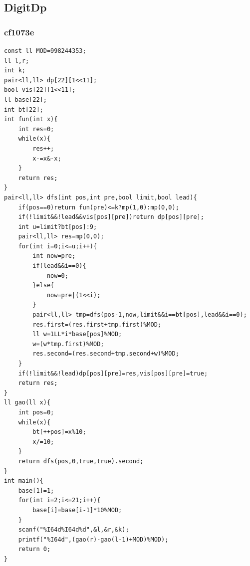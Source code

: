 \documentclass[twoside]{article}
\begin{document}
\subsection{DigitDp}
\subsubsection{cf1073e}
\begin{lstlisting}
const ll MOD=998244353;
ll l,r;
int k;
pair<ll,ll> dp[22][1<<11];
bool vis[22][1<<11];
ll base[22];
int bt[22];
int fun(int x){
    int res=0;
    while(x){
        res++;
        x-=x&-x;
    }
    return res;
}
pair<ll,ll> dfs(int pos,int pre,bool limit,bool lead){
    if(pos==0)return fun(pre)<=k?mp(1,0):mp(0,0);
    if(!limit&&!lead&&vis[pos][pre])return dp[pos][pre];
    int u=limit?bt[pos]:9;
    pair<ll,ll> res=mp(0,0);
    for(int i=0;i<=u;i++){
        int now=pre;
        if(lead&&i==0){
            now=0;
        }else{
            now=pre|(1<<i);
        }
        pair<ll,ll> tmp=dfs(pos-1,now,limit&&i==bt[pos],lead&&i==0);
        res.first=(res.first+tmp.first)%MOD;
        ll w=1LL*i*base[pos]%MOD;
        w=(w*tmp.first)%MOD;
        res.second=(res.second+tmp.second+w)%MOD;
    }
    if(!limit&&!lead)dp[pos][pre]=res,vis[pos][pre]=true;
    return res;
}
ll gao(ll x){
    int pos=0;
    while(x){
        bt[++pos]=x%10;
        x/=10;
    }
    return dfs(pos,0,true,true).second;
}
int main(){
    base[1]=1;
    for(int i=2;i<=21;i++){
        base[i]=base[i-1]*10%MOD;
    }
    scanf("%I64d%I64d%d",&l,&r,&k);
    printf("%I64d",(gao(r)-gao(l-1)+MOD)%MOD);
    return 0;
}
\end{lstlisting}
\end{document}
